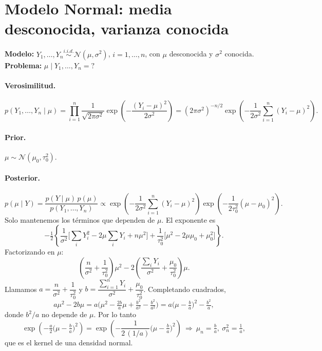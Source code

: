 \documentclass[11pt]{article}
\newcommand{\N}{\mathcal{N}}
\theoremstyle{definition}
\begin{document}
\section{Modelo Normal: media desconocida, varianza conocida}
\textbf{Modelo:} $Y_1,\dots,Y_n\overset{i.i.d.}{\sim}\N(\mu,\sigma^2)$, $i=1,\dots,n$, con $\mu$ desconocida y $\sigma^2$ conocida.\\
\textbf{Problema:} $\mu\mid Y_1,\dots,Y_n=?$

\paragraph{Verosimilitud.}
\[
p(Y_1,\dots,Y_n\mid\mu)=\prod_{i=1}^n\frac{1}{\sqrt{2\pi\sigma^2}}\exp\!\left(-\frac{(Y_i-\mu)^2}{2\sigma^2}\right)
=(2\pi\sigma^2)^{-n/2}\exp\!\left(-\frac{1}{2\sigma^2}\sum_{i=1}^n(Y_i-\mu)^2\right).
\]

\paragraph{Prior.} $\mu\sim\N(\mu_0,\tau_0^2)$.

\paragraph{Posterior.}
\[
p(\mu\mid Y)=\frac{p(Y\mid\mu)\,p(\mu)}{p(Y_1,\dots,Y_n)}
\propto\exp\!\left(-\frac{1}{2\sigma^2}\sum_{i=1}^n(Y_i-\mu)^2\right)\exp\!\left(-\frac{1}{2\tau_0^2}(\mu-\mu_0)^2\right).
\]
Solo mantenemos los términos que dependen de $\mu$. El exponente es
\[
-\tfrac12\left\{\frac{1}{\sigma^2}\Big[\sum_i Y_i^2-2\mu\sum_i Y_i+n\mu^2\Big]+\frac{1}{\tau_0^2}\big[\mu^2-2\mu\mu_0+\mu_0^2\big]\right\}.
\]
Factorizando en $\mu$:
\[
\left(\frac{n}{\sigma^2}+\frac{1}{\tau_0^2}\right)\mu^2-2\left(\frac{\sum_i Y_i}{\sigma^2}+\frac{\mu_0}{\tau_0^2}\right)\mu.
\]
Llamamos $a=\dfrac{n}{\sigma^2}+\dfrac{1}{\tau_0^2}$ y $b=\dfrac{\sum_{i=1}^n Y_i}{\sigma^2}+\dfrac{\mu_0}{\tau_0^2}$. Completando cuadrados,
\[
a\mu^2-2b\mu=a\Big(\mu^2-\tfrac{2b}{a}\mu+\tfrac{b^2}{a^2}-\tfrac{b^2}{a^2}\Big)=a\Big(\mu-\tfrac{b}{a}\Big)^2-\tfrac{b^2}{a},
\]
donde $b^2/a$ no depende de $\mu$. Por lo tanto
\[
\exp\!\left(-\tfrac{a}{2}\Big(\mu-\tfrac{b}{a}\Big)^2\right)=\exp\!\left(-\frac{1}{2\,(1/a)}\Big(\mu-\tfrac{b}{a}\Big)^2\right)
\ \Rightarrow\ \mu_n=\tfrac{b}{a},\ \sigma_n^2=\tfrac{1}{a},
\]
que es el kernel de una densidad normal.
\end{document}
